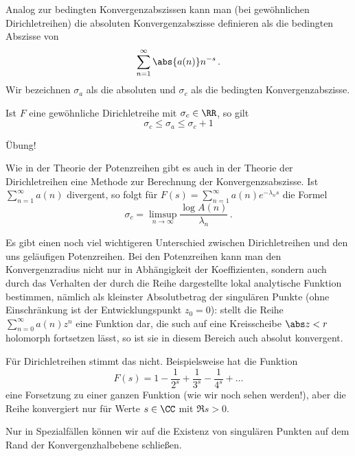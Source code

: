 Analog zur bedingten Konvergenzabszissen kann man (bei gewöhnlichen Dirichletreihen) die absoluten Konvergenzabszisse definieren als die bedingten Abszisse von
\[
	\sum_{n=1}^\infty \abs{a(n)} n^{-s}
	\,.
\]
Wir bezeichnen $\sigma_a$ als die absoluten und $\sigma_c$ als die bedingten Konvergenzabszisse.

\begin{satz}
	Ist $F$ eine gewöhnliche Dirichletreihe mit $\sigma_c \in \RR$, so gilt
	\[
		\sigma_c \leq \sigma_a \leq \sigma_c + 1
	\]
\end{satz}

\begin{bewe}
	Übung!
\end{bewe}

\begin{beme}
	Wie in der Theorie der Potenzreihen gibt es auch in der Theorie der Dirichletreihen eine Methode zur Berechnung der Konvergenzsabszisse.
	Ist $\sum_{n=1}^\infty a(n)$ divergent, so folgt für $F(s) = \sum_{n=1}^\infty a(n) e^{-\lambda_n s}$ die Formel
	\[
		\sigma_c = \limsup_{n\to\infty} \frac{\log{A(n)}}{\lambda_n}
		\,.
	\]
	
	Es gibt einen noch viel wichtigeren Unterschied zwischen Dirichletreihen und den uns geläufigen Potenzreihen.
	Bei den Potenzreihen kann man den Konvergenzradius nicht nur in Abhängigkeit der Koeffizienten, sondern auch durch das Verhalten der durch die Reihe dargestellte lokal analytische Funktion bestimmen, nämlich als kleinster Absolutbetrag der singulären Punkte (ohne Einschränkung ist der Entwicklungspunkt $z_0 = 0$): stellt die Reihe $\sum_{n=0}^\infty a(n)z^n$ eine Funktion dar, die such auf eine Kreisscheibe $\abs z < r$ holomorph fortsetzen lässt, so ist sie in diesem Bereich auch absolut konvergent.
	
	Für Dirichletreihen stimmt das nicht.
	Beispielsweise hat die Funktion
	\[
		F(s) = 1 - \frac 1{2^s} + \frac 1{3^s} - \frac 1{4^s} + \ldots
	\]
	eine Forsetzung zu einer ganzen Funktion (wie wir noch sehen werden!), aber die Reihe konvergiert nur für Werte $s \in \CC$ mit $\Re s > 0$.
	
	Nur in Spezialfällen können wir auf die Existenz von singulären Punkten auf dem Rand der Konvergenzhalbebene schließen.
\end{beme}

